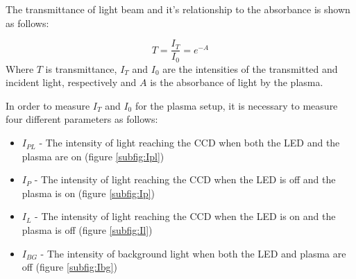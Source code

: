 \documentclass[11pt, oneside]{article}   	%
\begin{document}
The transmittance of light beam and it's relationship to the absorbance is shown as follows:


\begin{equation} \label{eqn:Transmittance}
    T = \frac{I_T}{I_0} = e^{-A}
\end{equation}
Where $T$ is transmittance, $I_T$ and $I_0$ are the intensities of the transmitted and incident light, respectively and $A$ is the absorbance of light by the plasma.

In order to measure $I_T$ and $I_0$ for the plasma setup, it is necessary to measure four different parameters as follows:
\begin{itemize}
    \item $I_{PL}$ - The intensity of light reaching the CCD when both the LED and the plasma are on (figure \ref{subfig:Ipl})
    \item $I_{P}$ - The intensity of light reaching the CCD when the LED is off and the plasma is on (figure \ref{subfig:Ip})
    \item $I_L$ - The intensity of light reaching the CCD when the LED is on and the plasma is off (figure \ref{subfig:Il})
    \item $I_{BG}$ - The intensity of background light when both the LED and plasma are off (figure \ref{subfig:Ibg})
\end{itemize}
\end{document}
